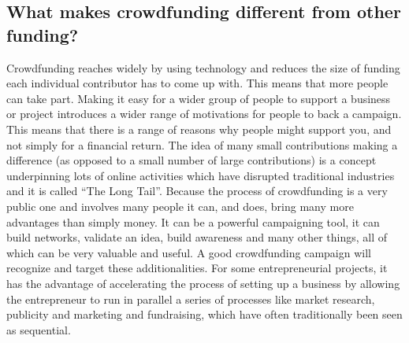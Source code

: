 \subsection*{ What makes crowdfunding different from other funding? }
Crowdfunding reaches widely by using technology and reduces the size of funding each individual contributor has to come up with. This means that more people can take part.
Making it easy for a wider group of people to support a business or project introduces a wider range of motivations for people to back a campaign. This means that there is a range of reasons why people might support you, and not simply for a financial return.
The idea of many small contributions making a difference (as opposed to a small number of large contributions) is a concept underpinning lots of online activities which have disrupted traditional industries and it is called “The Long Tail”.
Because the process of crowdfunding is a very public one and involves many people it can, and does, bring many more advantages than simply money. It can be a powerful campaigning tool, it can build networks, validate an idea, build awareness and many other things, all of which can be very valuable and useful. A good crowdfunding campaign will recognize and target these additionalities.
For some entrepreneurial projects, it has the advantage of accelerating the process of setting up a business by allowing the entrepreneur to run in parallel a series of processes like market research, publicity and marketing and fundraising, which have often traditionally been seen as sequential.







